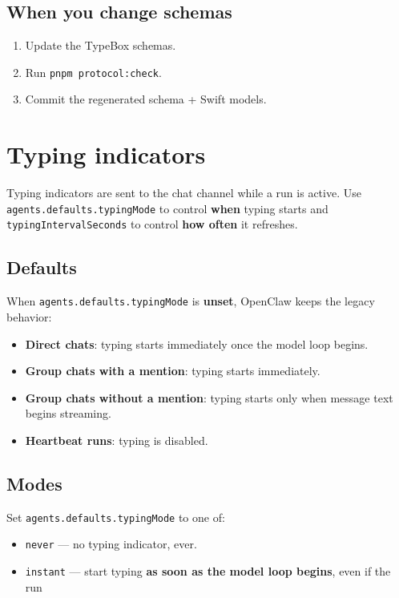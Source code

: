 \subsection{When you change schemas}


\begin{enumerate}
  \item Update the TypeBox schemas.
  \item Run \texttt{pnpm protocol:check}.
  \item Commit the regenerated schema + Swift models.
\end{enumerate}



\clearpage

\section{Typing indicators}


Typing indicators are sent to the chat channel while a run is active. Use
\texttt{agents.defaults.typingMode} to control \textbf{when} typing starts and \texttt{typingIntervalSeconds}
to control \textbf{how often} it refreshes.

\subsection{Defaults}


When \texttt{agents.defaults.typingMode} is \textbf{unset}, OpenClaw keeps the legacy behavior:

\begin{itemize}
  \item \textbf{Direct chats}: typing starts immediately once the model loop begins.
  \item \textbf{Group chats with a mention}: typing starts immediately.
  \item \textbf{Group chats without a mention}: typing starts only when message text begins streaming.
  \item \textbf{Heartbeat runs}: typing is disabled.
\end{itemize}


\subsection{Modes}


Set \texttt{agents.defaults.typingMode} to one of:

\begin{itemize}
  \item \texttt{never} — no typing indicator, ever.
  \item \texttt{instant} — start typing \textbf{as soon as the model loop begins}, even if the run
\end{itemize}

